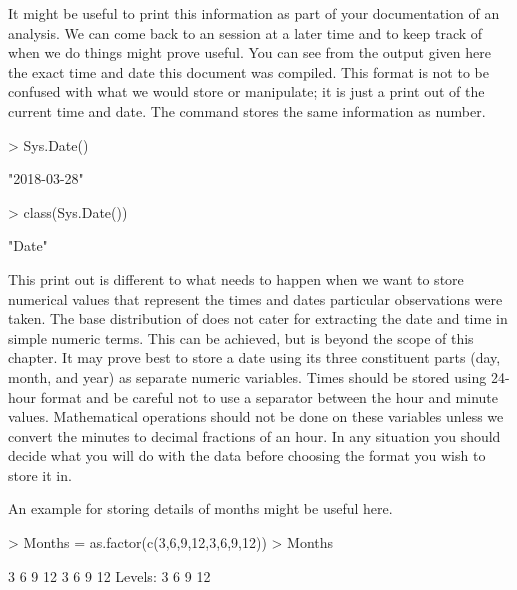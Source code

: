 It might be useful to print this information as part of your documentation of an analysis. We can come back to an \R{} session at a later time and to keep track of when we do things might prove useful. You can see from the output given here the exact time and date this document was compiled. This format is not to be confused with what we would store or manipulate; it is just a print out of the current time and date. The  command stores the same information as number. 

\begin{Schunk}
\begin{Sinput}
> Sys.Date() 
\end{Sinput}
\begin{Soutput}
[1] "2018-03-28"
\end{Soutput}
\begin{Sinput}
> class(Sys.Date()) 
\end{Sinput}
\begin{Soutput}
[1] "Date"
\end{Soutput}
\end{Schunk}

 
This print out is different to what needs to happen when we want to store numerical values that represent the times and dates particular observations were taken. The base distribution of \R{} does not cater for extracting the date and time in simple numeric terms. This can be achieved, but is beyond the scope of this chapter. It may prove best to store a date using its three constituent parts (day, month, and year) as separate numeric variables. Times should be stored using 24-hour format and be careful not to use a separator between the hour and minute values. Mathematical operations should not be done on these variables unless we convert the minutes to decimal fractions of an hour. In any situation you should decide what you will do with the data before choosing the format you wish to store it in. 
 
An example for storing details of months might be useful here. 

\begin{Schunk}
\begin{Sinput}
> Months = as.factor(c(3,6,9,12,3,6,9,12)) 
> Months 
\end{Sinput}
\begin{Soutput}
[1] 3  6  9  12 3  6  9  12
Levels: 3 6 9 12
\end{Soutput}
\end{Schunk}

